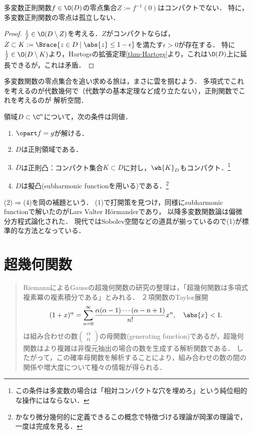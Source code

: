 \documentclass[uplatex, dvipdfmx]{jsreport}
\begin{document}
\begin{corollary}
    多変数正則関数$f\in\O(D)$の零点集合$Z:=f^{-1}(0)$はコンパクトでない．
    特に，多変数正則関数の零点は孤立しない．
\end{corollary}
\begin{proof}
    $\frac{1}{f}\in\O(D\setminus Z)$を考える．$Z$がコンパクトならば，$Z\subset K:=\Brace{z\in D\mid\abs{z}\le 1-\epsilon}$を満たす$\epsilon>0$が存在する．
    特に$\frac{1}{f}\in\O(D\setminus K)$より，Hartogsの拡張定理\ref{thm-Hartogs}より，これは$\O(D)$上に延長できるが，これは矛盾．
\end{proof}
\begin{remarks}
    多変数関数の零点集合を追い求める旅は，まさに雲を掴むよう．
    多項式でこれを考えるのが代数幾何で（代数学の基本定理など成り立たない），正則関数でこれを考えるのが
    解析空間．
\end{remarks}

\begin{theorem}
    領域$D\subset\C^n$について，次の条件は同値．
    \begin{enumerate}
        \item $\opart f=g$が解ける．
        \item $D$は正則領域である．
        \item $D$は正則凸：コンパクト集合$K\subset D$に対し，$\wh{K}_D$もコンパクト．\footnote{この条件は多変数の場合は「相対コンパクトな穴を埋めろ」という純位相的な操作にはならない．}
        \item $D$は擬凸(subharmonic functionを用いる)である．\footnote{かなり微分幾何的に定義できるこの概念で特徴づける理論が岡潔の理論で，一度は完成を見る．}
    \end{enumerate}
    (2)$\Rightarrow$(4)を岡の補題という．
    (1)で打開策を見つけ，同様にsubharmonic functionで解いたのがLars Valter Hörmanderであり，
    以降多変数関数論は偏微分方程式論化された．
    現代ではSobolev空間などの道具が揃っているので(1)が標準的な方法となっている．
\end{theorem}

\chapter{超幾何関数}

\begin{quotation}
    RiemannによるGaussの超幾何関数の研究の整理は，「超幾何関数は多項式複素冪の複素積分である」とみれる．
    ２項関数のTaylor展開
    \[(1+x)^\alpha=\sum_{n=0}^\infty\frac{\alpha(\alpha-1)\cdots(\alpha-n+1)}{n!}x^n,\quad\abs{x}<1.\]
    は組み合わせの数$\begin{pmatrix}\alpha\\n\end{pmatrix}$の母関数(generating function)であるが，超幾何関数はより複雑は非復元抽出の場合の数を生成する解析関数である．
    したがって，この確率母関数を解析することにより，組み合わせの数の間の関係や増大度について種々の情報が得られる．
\end{quotation}
\end{document}
